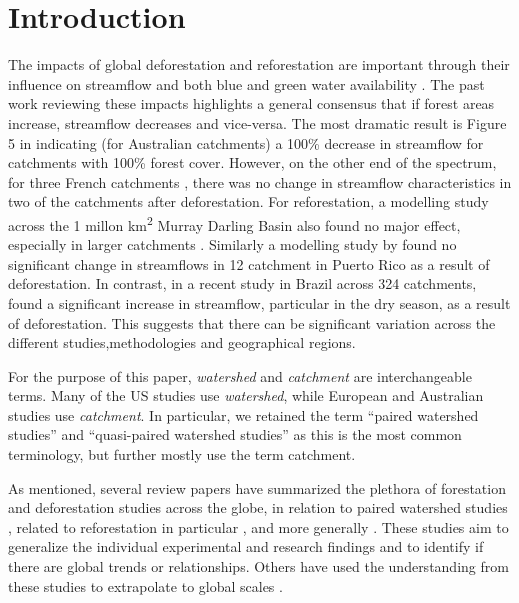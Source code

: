 \documentclass[]{elsarticle} %
\begin{document}
\hypertarget{introduction}{%
\section{Introduction}\label{introduction}}

The impacts of global deforestation and reforestation are important through their influence on streamflow and both blue and green water availability \citep{hoekvandijke2022, schyns2019}. The past work reviewing these impacts \citep{andreassian2004, jackson2005, zhang2017, brown2005, brown2013, filoso2017} highlights a general consensus that if forest areas increase, streamflow decreases and vice-versa. The most dramatic result is Figure 5 in \citet{zhang2011} indicating (for Australian catchments) a 100\% decrease in streamflow for catchments with 100\% forest cover. However, on the other end of the spectrum, for three French catchments \citep{cosandey2005}, there was no change in streamflow characteristics in two of the catchments after deforestation. For reforestation, a modelling study across the 1 millon km\textsuperscript{2} Murray Darling Basin also found no major effect, especially in larger catchments \citep{vandijk2007}. Similarly a modelling study by \citet{beck2013} found no significant change in streamflows in 12 catchment in Puerto Rico as a result of deforestation. In contrast, in a recent study in Brazil across 324 catchments, \citet{levy2018} found a significant increase in streamflow, particular in the dry season, as a result of deforestation. This suggests that there can be significant variation across the different studies,methodologies and geographical regions.

For the purpose of this paper, \emph{watershed} and \emph{catchment} are interchangeable terms. Many of the US studies use \emph{watershed}, while European and Australian studies use \emph{catchment}. In particular, we retained the term ``paired watershed studies'' and ``quasi-paired watershed studies'' as this is the most common terminology, but further mostly use the term catchment.

As mentioned, several review papers have summarized the plethora of forestation and deforestation studies across the globe, in relation to paired watershed studies \citep{brown2005, hewlett1984}, related to reforestation in particular \citep{filoso2017}, and more generally \citep{jackson2005, zhang2017}. These studies aim to generalize the individual experimental and research findings and to identify if there are global trends or relationships. Others have used the understanding from these studies to extrapolate to global scales \citep{hoekvandijke2022}.
\end{document}
